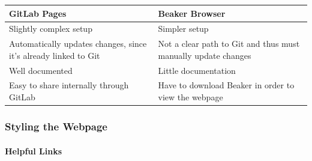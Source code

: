 \documentclass[openany]{article}
\let\oldparagraph\paragraph
\renewcommand{\paragraph}[1]{\oldparagraph{#1}\mbox{}}
\begin{document}
\begin{longtable}[]{@{}ll@{}}
\toprule
\begin{minipage}[b]{0.47\columnwidth}\raggedright
GitLab Pages\strut
\end{minipage} & \begin{minipage}[b]{0.47\columnwidth}\raggedright
Beaker Browser\strut
\end{minipage}\tabularnewline
\midrule
\endhead
\begin{minipage}[t]{0.47\columnwidth}\raggedright
Slightly complex setup\strut
\end{minipage} & \begin{minipage}[t]{0.47\columnwidth}\raggedright
Simpler setup\strut
\end{minipage}\tabularnewline
\begin{minipage}[t]{0.47\columnwidth}\raggedright
Automatically updates changes, since it's already linked to Git\strut
\end{minipage} & \begin{minipage}[t]{0.47\columnwidth}\raggedright
Not a clear path to Git and thus must manually update changes\strut
\end{minipage}\tabularnewline
\begin{minipage}[t]{0.47\columnwidth}\raggedright
Well documented\strut
\end{minipage} & \begin{minipage}[t]{0.47\columnwidth}\raggedright
Little documentation\strut
\end{minipage}\tabularnewline
\begin{minipage}[t]{0.47\columnwidth}\raggedright
Easy to share internally through GitLab\strut
\end{minipage} & \begin{minipage}[t]{0.47\columnwidth}\raggedright
Have to download Beaker in order to view the webpage\strut
\end{minipage}\tabularnewline
\bottomrule
\end{longtable}

\hypertarget{styling-the-webpage}{%
\subsubsection{Styling the Webpage}\label{styling-the-webpage}}

\hypertarget{helpful-links}{%
\paragraph{Helpful Links}\label{helpful-links}}
\end{document}
